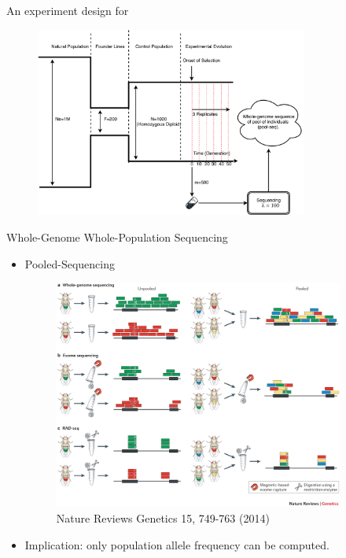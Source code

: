 \documentclass[t]{beamer} %
\begin{document}
\begin{frame}{An experiment design for \dmel}
	\begin{figure}
		\includegraphics[trim={18in 0.0in 0.0in 
			0in},clip,width=0.8\textwidth]{../figures/ExperimentalEvolution}
	\end{figure}
\end{frame}

\begin{frame}{Whole-Genome Whole-Population Sequencing}
	\begin{itemize}
		\item Pooled-Sequencing 
		\begin{figure}
			\includegraphics[trim={.05in 7.5in 0.0in 
				0in},clip,width=0.9\textwidth]{../figures/pool-seq}\\
			\tiny{Nature Reviews Genetics 15, 749-763 (2014)}
		\end{figure}
		\pause
			\item Implication: only population allele frequency can be computed.
	\end{itemize}	
\end{frame}
\end{document}
